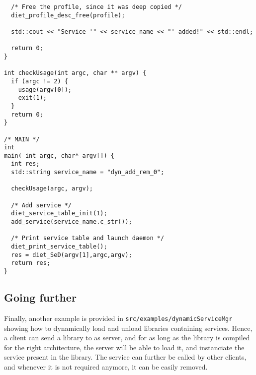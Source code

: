 {\begin{verbatim}
  /* Free the profile, since it was deep copied */
  diet_profile_desc_free(profile);

  std::cout << "Service '" << service_name << "' added!" << std::endl;

  return 0;
}

int checkUsage(int argc, char ** argv) {
  if (argc != 2) {
    usage(argv[0]);
    exit(1);
  }
  return 0;
}

/* MAIN */
int
main( int argc, char* argv[]) {
  int res;
  std::string service_name = "dyn_add_rem_0";

  checkUsage(argc, argv);

  /* Add service */
  diet_service_table_init(1);
  add_service(service_name.c_str());

  /* Print service table and launch daemon */
  diet_print_service_table();
  res = diet_SeD(argv[1],argc,argv);
  return res;
}
\end{verbatim}
}


\subsection{Going further}

Finally, another example is provided in
\texttt{src/examples/dynamicServiceMgr} showing how to dynamically
load and unload libraries containing services. Hence, a client can
send a library to as server, and for as long as the library is
compiled for the right architecture, the server will be able to load
it, and instanciate the service present in the library. The service
can further be called by other clients, and whenever it is not
required anymore, it can be easily removed.
